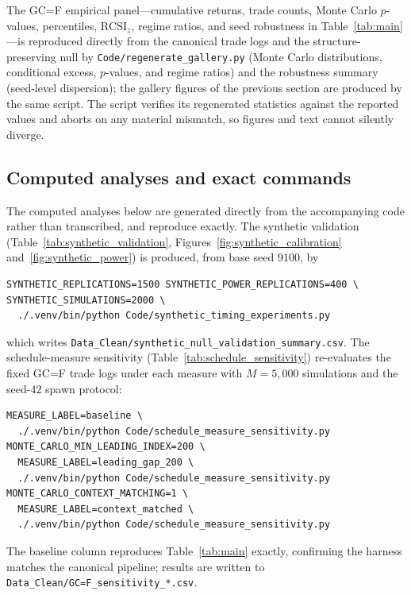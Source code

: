 \documentclass[preprint,12pt]{elsarticle}
\theoremstyle{definition}
\begin{document}
The GC=F empirical panel---cumulative returns, trade counts, Monte Carlo $p$-values, percentiles, $\mathrm{RCSI}_z$, regime ratios, and seed robustness in Table~\ref{tab:main}---is reproduced directly from the canonical trade logs and the structure-preserving null by \texttt{Code/regenerate\_gallery.py} (Monte Carlo distributions, conditional excess, $p$-values, and regime ratios) and the robustness summary (seed-level dispersion); the gallery figures of the previous section are produced by the same script. The script verifies its regenerated statistics against the reported values and aborts on any material mismatch, so figures and text cannot silently diverge.

\subsection{Computed analyses and exact commands}

The computed analyses below are generated directly from the accompanying code rather than transcribed, and reproduce exactly. The synthetic validation (Table~\ref{tab:synthetic_validation}, Figures~\ref{fig:synthetic_calibration} and~\ref{fig:synthetic_power}) is produced, from base seed $9100$, by
\begin{verbatim}
SYNTHETIC_REPLICATIONS=1500 SYNTHETIC_POWER_REPLICATIONS=400 \
SYNTHETIC_SIMULATIONS=2000 \
  ./.venv/bin/python Code/synthetic_timing_experiments.py
\end{verbatim}
which writes \texttt{Data\_Clean/synthetic\_null\_validation\_summary.csv}. The schedule-measure sensitivity (Table~\ref{tab:schedule_sensitivity}) re-evaluates the fixed GC=F trade logs under each measure with $M=5{,}000$ simulations and the seed-$42$ spawn protocol:
\begin{verbatim}
MEASURE_LABEL=baseline \
  ./.venv/bin/python Code/schedule_measure_sensitivity.py
MONTE_CARLO_MIN_LEADING_INDEX=200 \
  MEASURE_LABEL=leading_gap_200 \
  ./.venv/bin/python Code/schedule_measure_sensitivity.py
MONTE_CARLO_CONTEXT_MATCHING=1 \
  MEASURE_LABEL=context_matched \
  ./.venv/bin/python Code/schedule_measure_sensitivity.py
\end{verbatim}
The baseline column reproduces Table~\ref{tab:main} exactly, confirming the harness matches the canonical pipeline; results are written to \texttt{Data\_Clean/\allowbreak GC=F\_sensitivity\_*.csv}.
\end{document}
